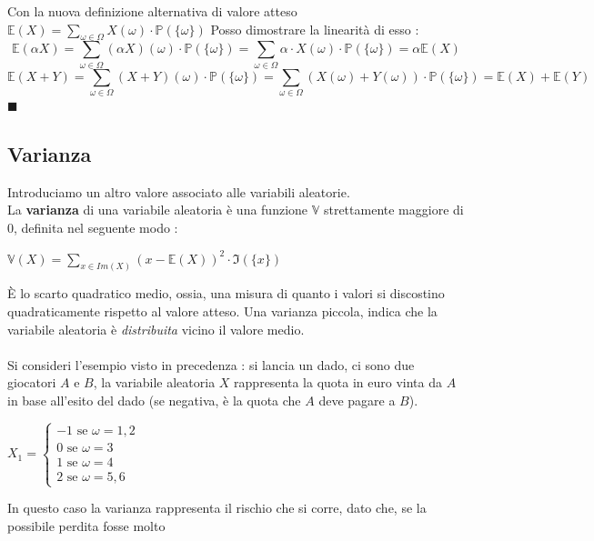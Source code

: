 \documentclass[12pt, letterpaper]{article}
\newcommand{\E}{{\mathbb E}}
\newcommand{\Prob}{{\mathbb P}}
\begin{document}
Con la nuova definizione alternativa di valore atteso 
\(
    \E(X)=\displaystyle\sum_{\omega\in\Omega}X(\omega)\cdot\Prob(\{\omega\})
    \)
Posso dimostrare la linearità di esso :\begin{equation}
    \E(\alpha X)=\sum_{\omega\in\Omega}(\alpha X)(\omega)\cdot\Prob(\{\omega\})=\sum_{\omega\in\Omega}\alpha\cdot X(\omega)\cdot\Prob(\{\omega\})=\alpha\E(X)
\end{equation}\begin{equation}
    \E(X+Y)=\sum_{\omega\in\Omega}(X+Y)(\omega)\cdot\Prob(\{\omega\})=\sum_{\omega\in\Omega}(X(\omega)+Y(\omega))\cdot\Prob(\{\omega\})=\E(X)+\E(Y)
\end{equation}
\raggedleft\(\blacksquare\)\\
\raggedright

\subsection{Varianza}
Introduciamo un altro valore associato alle variabili aleatorie.\\
La \textbf{varianza} di una variabile aleatoria è una funzione \(\mathbb{V}\) strettamente maggiore di 0, definita nel seguente modo :
\begin{center}
    \(
    \mathbb{V}(X)=\displaystyle\sum_{x\in Im(X)}(x-\mathbb{E}(X))^2\cdot   \Im(\{x\})  
    \)
\end{center}
È lo scarto quadratico medio, ossia, una misura di quanto i valori si discostino 
quadraticamente rispetto al valore atteso. Una varianza piccola, indica che la variabile 
aleatoria è \textit{distribuita} vicino il valore medio.\\\hphantom{}\\
Si consideri l'esempio visto in precedenza : si lancia un dado, ci sono due giocatori \(A\) e \(B\), la variabile aleatoria \(X\) 
rappresenta la quota in euro vinta da \(A\) in base all'esito del dado (se negativa, è la quota che \(A\) deve pagare 
a \(B\)).\begin{center}
    \(
    X_1=\begin{cases}
        -1\text{ se }\omega=1,2\\
        0\text{ se  }\omega=3\\
        1\text{  se }\omega=4\\
        2\text{ se  }\omega=5,6
    \end{cases}    
    \)
\end{center}
In questo caso la varianza rappresenta il rischio che si corre, dato che, se la possibile perdita fosse molto 
\end{document}
